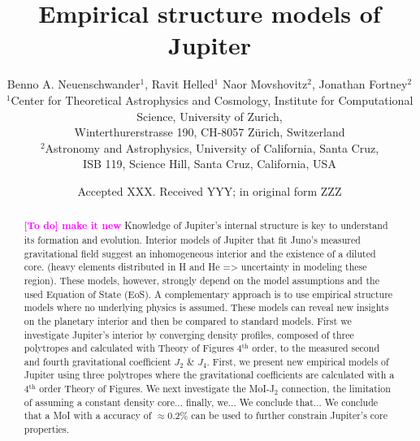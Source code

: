 \documentclass[usenatbib]{mnras}
\title{Empirical structure models of  Jupiter}
\author[]{{Benno A. Neuenschwander}$^{1}$,
{Ravit Helled}$^{1}$
{Naor Movshovitz}$^{2}$,
{Jonathan Fortney}$^{2}$
\\
$^{1}$Center for Theoretical Astrophysics and Cosmology, Institute for Computational Science, University of Zurich, \\Winterthurerstrasse 190, CH-8057 Z{\"u}rich, Switzerland\\
$^{2}$Astronomy and Astrophysics, University of California, Santa Cruz, \\ ISB 119, Science Hill, Santa Cruz, California, USA\\
}
\date{Accepted XXX. Received YYY; in original form ZZZ}
\def\lsim{\mathrel{\rlap{\lower 3pt \hbox{$\sim$}} \raise 2.0pt \hbox{$<$}}}
\newcommand{\TD}[1]{\textcolor{magenta}{\bf [To do] #1}}
\newcommand{\sub}[1]{_{\text{#1}}}
\begin{document}
\label{firstpage}

\pagerange{\pageref{firstpage}--\pageref{lastpage}}

\maketitle


\begin{abstract}
\TD{make it new}
Knowledge of Jupiter's internal structure is key to understand its formation and evolution. 
Interior models of Jupiter that fit Juno's measured gravitational field suggest an inhomogeneous interior and the existence of a diluted core. (heavy elements distributed in H and He => uncertainty in modeling these region). These 
models, however, strongly depend on the model assumptions and the used Equation of State (EoS). 
A complementary approach is to use empirical structure models where no underlying physics is assumed. 
These models can reveal new insights on the planetary interior and then be compared to standard models. 
First we investigate Jupiter's interior by converging density profiles, composed of three polytropes and calculated with Theory of Figures 4$^{\text{th}}$ order, to the measured second and fourth gravitational coefficient $J_2$ \& $J_4$. 
First, we present new empirical models of Jupiter using three polytropes where the gravitational coefficients are calculated with a 4$^{\text{th}}$ order Theory of Figures. We next investigate the MoI-J$_2$ connection, the limitation of assuming a constant density core...  finally, we... We conclude that...
We conclude that a MoI with a accuracy of $\approx0.2\%$ can be used to further constrain Jupiter's core properties. 

\end{abstract}
\end{document}
